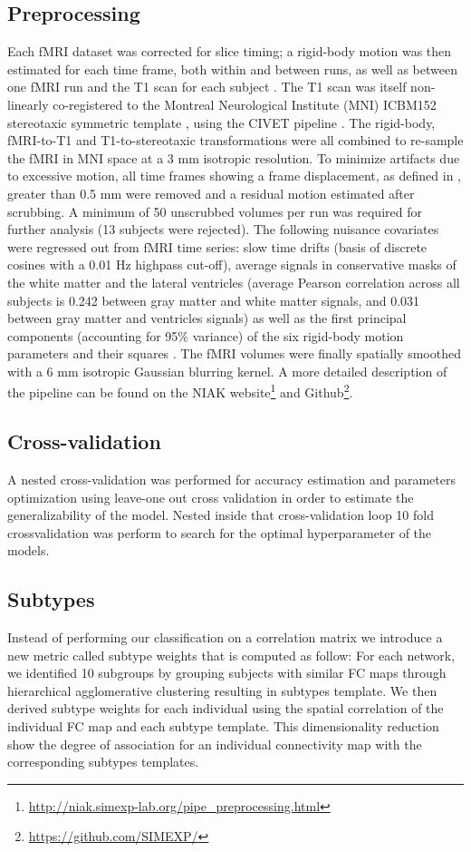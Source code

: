 \documentclass[authoryear]{elsarticle}
\begin{document}
\subsection{Preprocessing}
Each fMRI dataset was corrected for slice timing; a rigid-body motion was then estimated for each time frame, both within and between runs, as well as between one fMRI run and the T1 scan for each subject \citep{Collins1994}. The T1 scan was itself non-linearly co-registered to the Montreal Neurological Institute (MNI) ICBM152 stereotaxic symmetric template \citep{Fonov2011}, using the CIVET pipeline \citep{Ad-Dab'bagh2006}. The rigid-body, fMRI-to-T1 and T1-to-stereotaxic transformations were all combined to re-sample the fMRI in MNI space at a 3 mm isotropic resolution. To minimize artifacts due to excessive motion, all time frames showing a frame displacement, as defined in \cite{Power2012}, greater than 0.5 mm were removed and a residual motion estimated after scrubbing. A minimum of 50 unscrubbed volumes per run was required for further analysis (13 subjects were rejected). The following nuisance covariates were regressed out from fMRI time series: slow time drifts (basis of discrete cosines with a 0.01 Hz highpass cut-off), average signals in conservative masks of the white matter and the lateral ventricles (average Pearson correlation across all subjects is 0.242  between gray matter and white matter signals, and 0.031 between gray matter and ventricles signals) as well as the first principal components (accounting for 95\% variance) of the six rigid-body motion parameters and their squares \citep{Giove2009,Lund2006}. The fMRI volumes were finally spatially smoothed with a 6 mm isotropic Gaussian blurring kernel. A more detailed description of the pipeline can be found on the NIAK website\footnote{\url{http://niak.simexp-lab.org/pipe_preprocessing.html}} and Github\footnote{\url{https://github.com/SIMEXP/}}.




\subsection{Cross-validation}
A nested cross-validation was performed for accuracy estimation and parameters optimization using leave-one out cross validation in order to estimate the generalizability of the model. Nested inside that cross-validation loop 10 fold crossvalidation was perform to search for the optimal hyperparameter of the models. 

\subsection{Subtypes}
Instead of performing our classification on a correlation matrix we introduce a new metric called subtype weights that is computed as follow:
For each network, we identified 10 subgroups by grouping subjects with similar FC maps through hierarchical agglomerative clustering resulting in subtypes template. We then derived subtype weights for each individual using the spatial correlation of the individual FC map and each subtype template. This dimensionality reduction show the degree of association for an individual connectivity map with the corresponding subtypes templates.
\end{document}
